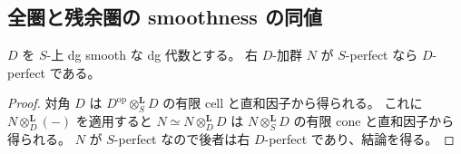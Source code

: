 \subsection{全圏と残余圏の smoothness の同値}

\begin{lemma}
\label{lem:relative-smooth-perfect-module}
$D$ を $S$-上 dg smooth な dg 代数とする。
右 $D$-加群 $N$ が $S$-perfect なら $D$-perfect である。
\end{lemma}
\begin{proof}
対角 $D$ は $D^{\mathrm{op}}\otimes_S^{\mathbf L}D$ の有限 cell と直和因子から得られる。
これに $N\otimes_D^{\mathbf L}(-)$ を適用すると
$N\simeq N\otimes_D^{\mathbf L}D$ は
$N\otimes_S^{\mathbf L}D$ の有限 cone と直和因子から得られる。
$N$ が $S$-perfect なので後者は右 $D$-perfect であり、結論を得る。
\end{proof}

